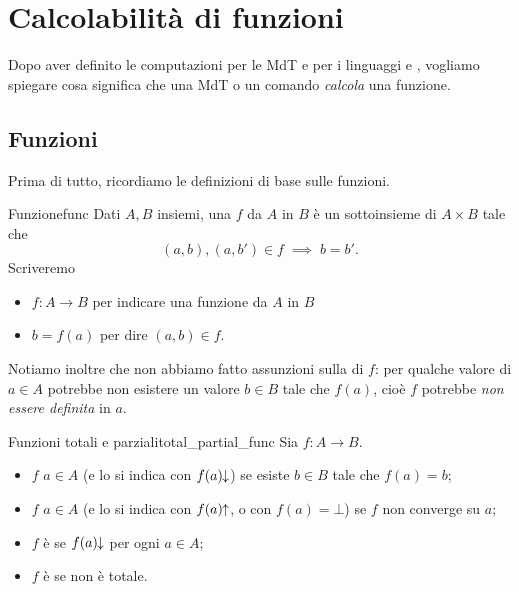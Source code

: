 \section{Calcolabilità di funzioni}

Dopo aver definito le computazioni per le MdT e per i linguaggi  e , vogliamo spiegare cosa significa che una MdT o un comando \emph{calcola} una funzione. 

\subsection*{Funzioni}

Prima di tutto, ricordiamo le definizioni di base sulle funzioni.

\begin{definition}
    {Funzione}{func}
    Dati $A, B$ insiemi, una  $f$ da $A$ in $B$ è un sottoinsieme di $A \times B$ tale che \[
        (a, b), (a, b') \in f \;\implies\; b = b'.
    \] Scriveremo \begin{itemize}
        \item $f : A \to B$ per indicare una funzione da $A$ in $B$
        \item $b = f(a)$ per dire $(a, b) \in f$.
    \end{itemize}
\end{definition}

 Notiamo inoltre che non abbiamo fatto assunzioni sulla  di $f$: per qualche valore di $a \in A$ potrebbe non esistere un valore $b \in B$ tale che $f(a)$, cioè $f$ potrebbe \emph{non essere definita} in $a$.

\begin{definition}
    {Funzioni totali e parziali}{total_partial_func}
    Sia $f : A \to B$. \begin{itemize}
        \item $f$  $a \in A$ (e lo si indica con $f(a)\!\!\downarrow$) se esiste $b \in B$ tale che $f(a) = b$;
        \item $f$  $a \in A$ (e lo si indica con $f(a)\!\!\uparrow$, o con $f(a) = \bot$) se $f$ non converge su $a$;
        \item $f$ è  se $f(a)\!\!\downarrow$ per ogni $a \in A$;
        \item $f$ è  se non è totale.     
    \end{itemize}   
\end{definition}


